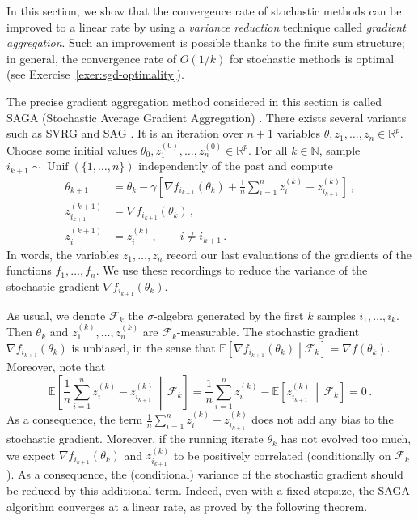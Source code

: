 \documentclass[11pt,reqno]{article}
\DeclareMathOperator{\Unif}{Unif}
\newcommand{\N}{\mathbb{N}}
\newcommand{\E}{\mathbb{E}}
\newcommand{\R}{\mathbb{R}}
\newcommand{\cF}{\mathcal{F}}
\numberwithin{equation}{section}
\theoremstyle{plain}
\theoremstyle{definition}
\theoremstyle{remark}
\begin{document}
In this section, we show that the convergence rate of stochastic methods can be improved to a linear rate by using a \emph{variance reduction} technique called \emph{gradient aggregation}. Such an improvement is possible thanks to the finite sum structure; in general, the convergence rate of $O(1/k)$ for stochastic methods is optimal (see Exercise~\ref{exer:sgd-optimality}).

The precise gradient aggregation method considered in this section is called SAGA (Stochastic Average Gradient Aggregation) \cite{defazio2014saga}. There exists several variants such as SVRG \cite{johnson2013accelerating} and SAG \cite{roux2012stochastic,schmidt2017minimizing}. It is an iteration over $n+1$ variables $\theta, z_1, \dots, z_n \in \R^p$. Choose some initial values $\theta_0, z_1^{(0)}, \dots, z_n^{(0)} \in \R^p$. For all $k \in \N$, sample $i_{k+1} \sim \Unif(\{1, \dots, n\})$ independently of the past and compute
\begin{align*}
\theta_{k+1} &= \theta_k - \gamma \left[\nabla f_{i_{k+1}}(\theta_k) +\frac{1}{n} \sum_{i=1}^{n} z_i^{(k)} - z^{(k)}_{i_{k+1}}\right] \, ,  \\
z^{(k+1)}_{i_{k+1}} &= \nabla f_{i_{k+1}}(\theta_k) \, , \\
z^{(k+1)}_i &= z^{(k)}_i \, , \qquad i \neq i_{k+1} \, .
\end{align*}
In words, the variables $z_1, \dots, z_n$ record our last evaluations of the gradients of the functions $f_1, \dots, f_n$. We use these recordings to reduce the variance of the stochastic gradient $\nabla f_{i_{k+1}}(\theta_k)$. 

As usual, we denote $\cF_k$ the $\sigma$-algebra generated by the first $k$ samples $i_1, \dots, i_k$. Then $\theta_k$ and $z_1^{(k)}, \dots, z_n^{(k)}$ are $\cF_k$-measurable. The stochastic gradient $\nabla f_{i_{k+1}}(\theta_k)$ is unbiased, in the sense that $\E\left[\nabla f_{i_{k+1}}(\theta_k)\middle\vert \cF_k\right] = \nabla f(\theta_k)$. Moreover, note that 
\begin{equation*}
	\E\left[ \frac{1}{n} \sum_{i=1}^{n} z_i^{(k)} - z^{(k)}_{i_{k+1}} \, \middle\vert \, \cF_k \right] = \frac{1}{n} \sum_{i=1}^{n} z_i^{(k)} - \E\left[  z^{(k)}_{i_{k+1}} \, \middle\vert \, \cF_k \right] = 0 \, .
\end{equation*} 
As a consequence, the term $\frac{1}{n} \sum_{i=1}^{n} z_i^{(k)} - z^{(k)}_{i_{k+1}}$ does not add any bias to the stochastic gradient. Moreover, if the running iterate $\theta_k$ has not evolved too much, we expect $\nabla f_{i_{k+1}}(\theta_k)$ and $z^{(k)}_{i_{k+1}}$ to be positively correlated (conditionally on $\cF_k$). As a consequence, the (conditional) variance of the stochastic gradient should be reduced by this additional term. Indeed, even with a fixed stepsize, the SAGA algorithm converges at a linear rate, as proved by the following theorem.
\end{document}

